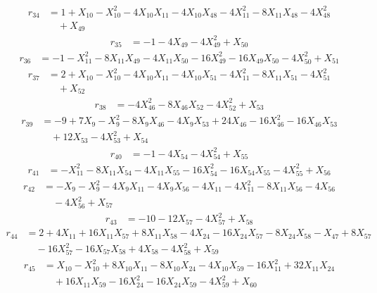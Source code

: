 \begin{align*}
r_{34}&=1+X_{10}-X_{10}^{2}-4X_{10}X_{11}-4X_{10}X_{48}-4X_{11}^{2}-8X_{11}X_{48}-4X_{48}^{2}\\
&\quad +X_{49}
\end{align*}
\begin{align*}
r_{35}&=-1-4X_{49}-4X_{49}^{2}+X_{50}
\end{align*}
\begin{align*}
r_{36}&=-1-X_{11}^{2}-8X_{11}X_{49}-4X_{11}X_{50}-16X_{49}^{2}-16X_{49}X_{50}-4X_{50}^{2}+X_{51}
\end{align*}
\begin{align*}
r_{37}&=2+X_{10}-X_{10}^{2}-4X_{10}X_{11}-4X_{10}X_{51}-4X_{11}^{2}-8X_{11}X_{51}-4X_{51}^{2}\\
&\quad +X_{52}
\end{align*}
\begin{align*}
r_{38}&=-4X_{46}^{2}-8X_{46}X_{52}-4X_{52}^{2}+X_{53}
\end{align*}
\begin{align*}
r_{39}&=-9+7X_{9}-X_{9}^{2}-8X_{9}X_{46}-4X_{9}X_{53}+24X_{46}-16X_{46}^{2}-16X_{46}X_{53}\\
&\quad +12X_{53}-4X_{53}^{2}+X_{54}
\end{align*}
\begin{align*}
r_{40}&=-1-4X_{54}-4X_{54}^{2}+X_{55}
\end{align*}
\begin{align*}
r_{41}&=-X_{11}^{2}-8X_{11}X_{54}-4X_{11}X_{55}-16X_{54}^{2}-16X_{54}X_{55}-4X_{55}^{2}+X_{56}
\end{align*}
\begin{align*}
r_{42}&=-X_{9}-X_{9}^{2}-4X_{9}X_{11}-4X_{9}X_{56}-4X_{11}-4X_{11}^{2}-8X_{11}X_{56}-4X_{56}\\
&\quad -4X_{56}^{2}+X_{57}
\end{align*}
\begin{align*}
r_{43}&=-10-12X_{57}-4X_{57}^{2}+X_{58}
\end{align*}
\begin{align*}
r_{44}&=2+4X_{11}+16X_{11}X_{57}+8X_{11}X_{58}-4X_{24}-16X_{24}X_{57}-8X_{24}X_{58}-X_{47}+8X_{57}\\
&\quad -16X_{57}^{2}-16X_{57}X_{58}+4X_{58}-4X_{58}^{2}+X_{59}
\end{align*}
\begin{align*}
r_{45}&=X_{10}-X_{10}^{2}+8X_{10}X_{11}-8X_{10}X_{24}-4X_{10}X_{59}-16X_{11}^{2}+32X_{11}X_{24}\\
&\quad +16X_{11}X_{59}-16X_{24}^{2}-16X_{24}X_{59}-4X_{59}^{2}+X_{60}
\end{align*}

